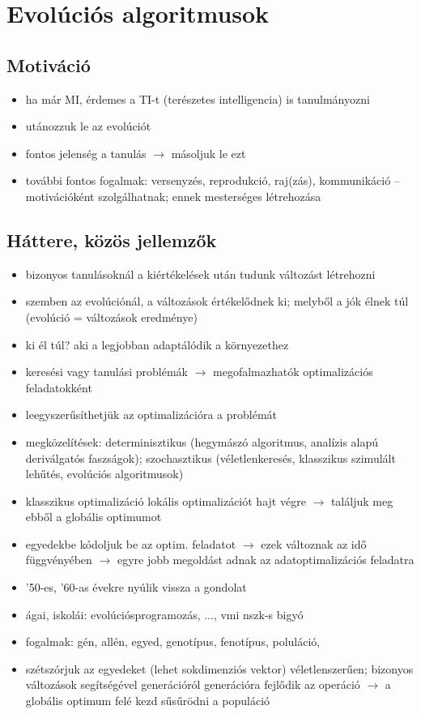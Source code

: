 \documentclass[a4paper, 11pt]{article}
\begin{document}
\newpage

\section{Evolúciós algoritmusok}

\subsection{Motiváció}

\begin{itemize}
	\item ha már MI, érdemes a TI-t (terészetes intelligencia) is tanulmányozni
	\item utánozzuk le az evolúciót
	\item fontos jelenség a tanulás $\to$ másoljuk le ezt
	\item további fontos fogalmak: versenyzés, reprodukció, raj(zás), kommunikáció -- motivációként szolgálhatnak; ennek mesterséges létrehozása
\end{itemize}

\subsection{Háttere, közös jellemzők}

\begin{itemize}
	\item bizonyos tanulásoknál a kiértékelések után tudunk változást létrehozni
	\item szemben az evolúciónál, a változások értékelődnek ki; melyből a jók élnek túl (evolúció = változások eredménye)
	\item ki él túl? aki a legjobban adaptálódik a környezethez
	\item keresési vagy tanulási problémák $\to$ megofalmazhatók optimalizációs feladatokként
	\item leegyszerűsíthetjük az optimalizációra a problémát
	\item megközelítések: determinisztikus (hegymászó algoritmus, analízis alapú deriválgatós faszságok); szochasztikus (véletlenkeresés, klasszikus szimulált lehűtés, evolúciós algoritmusok)
	\item klasszikus optimalizáció lokális optimalizációt hajt végre $\to$ találjuk meg ebből a globális optimumot
	\item egyedekbe kódoljuk be az optim. feladatot $\to$ ezek változnak az idő függvényében $\to$ egyre jobb megoldást adnak az adatoptimalizációs feladatra
	\item '50-es, '60-as évekre nyúlik vissza a gondolat
	\item ágai, iskolái: evolúciósprogramozás, ..., vmi nszk-s bigyó
	\item fogalmak: gén, allén, egyed, genotípus, fenotípus, poluláció,
	\item szétszórjuk az egyedeket (lehet sokdimenziós vektor) véletlenszerűen; bizonyos változások segítségével generációról generációra fejlődik az operáció $\to$ a globális optimum felé kezd sűsűrödni a populáció
\end{itemize}
\end{document}
